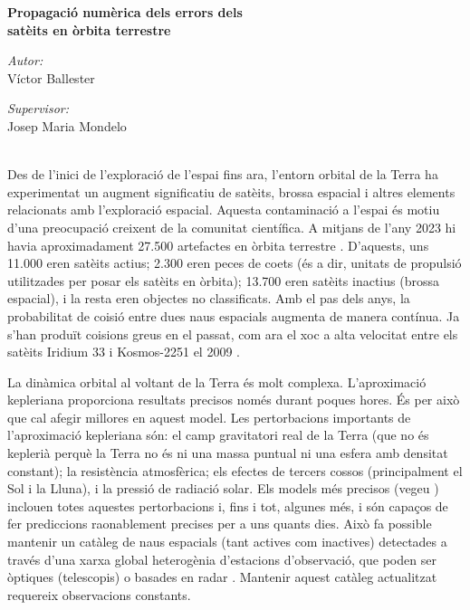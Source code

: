 \documentclass{article}
\begin{document}
\begin{center}
  \Large \textbf{Propagació numèrica dels errors dels\\satè\lgem its en òrbita terrestre}
\end{center}
\vspace{0.4cm}
\begin{minipage}[t]{0.49\textwidth}
  \begin{flushleft} \large
    \emph{Autor:}\\[0.1cm]
    Víctor Ballester
  \end{flushleft}
\end{minipage}\hfill
\begin{minipage}[t]{0.49\textwidth}
  \begin{flushright} \large
    \emph{Supervisor:} \\[0.1cm]
    Josep Maria Mondelo
  \end{flushright}
\end{minipage}\\[0.3cm]


Des de l'inici de l'exploració de l'espai fins ara, l'entorn orbital de la Terra ha experimentat un augment significatiu de satè\lgem its, brossa espacial i altres elements relacionats amb l'exploració espacial. Aquesta contaminació a l'espai és motiu d'una preocupació creixent de la comunitat científica. A mitjans de l'any 2023 hi havia aproximadament 27.500 artefactes en òrbita terrestre \cite{web:spacetrack_cat}. D'aquests, uns 11.000 eren satè\lgem its actius; 2.300 eren peces de coets (és a dir, unitats de propulsió utilitzades per posar els satè\lgem its en òrbita); 13.700 eren satè\lgem its inactius (brossa espacial), i la resta eren objectes no classificats. Amb el pas dels anys, la probabilitat de co\lgem isió entre dues naus espacials augmenta de manera contínua. Ja s'han produït co\lgem isions greus en el passat, com ara el xoc a alta velocitat entre els satè\lgem its Iridium 33 i Kosmos-2251 el 2009 \cite{wiki:collision_cat}.

La dinàmica orbital al voltant de la Terra és molt complexa. L'aproximació kepleriana proporciona resultats precisos només durant poques hores. És per això que cal afegir millores en aquest model. Les pertorbacions importants de l'aproximació kepleriana són: el camp gravitatori real de la Terra (que no és keplerià perquè la Terra no és ni una massa puntual ni una esfera amb densitat constant); la resistència atmosfèrica; els efectes de tercers cossos (principalment el Sol i la Lluna), i la pressió de radiació solar. Els models més precisos (vegeu \cite{sgp4OrbitDet_cat}) inclouen totes aquestes pertorbacions i, fins i tot, algunes més, i són capaços de fer prediccions raonablement precises per a uns quants dies. Això fa possible mantenir un catàleg de naus espacials (tant actives com inactives) detectades a través d'una xarxa global heterogènia d'estacions d'observació, que poden ser òptiques (telescopis) o basades en radar \cite{web:spacetrack_cat,web:celestrak_cat}. Mantenir aquest catàleg actualitzat requereix observacions constants.
\end{document}
